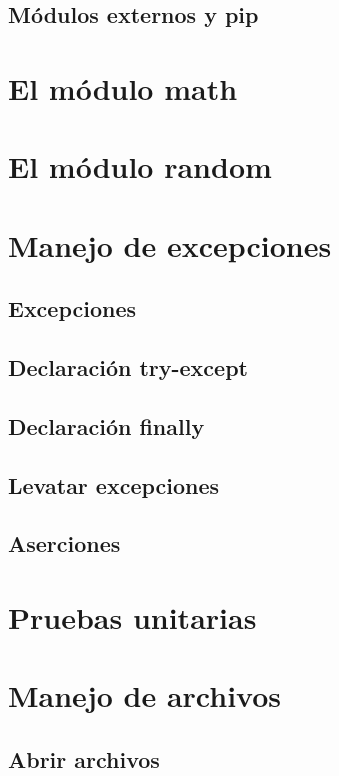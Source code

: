 \documentclass{article}
\begin{document}
\subsection{Módulos externos y pip}

\newpage\section{El módulo math}

\newpage\section{El módulo random}

\newpage\section{Manejo de excepciones}

\subsection{Excepciones}

\subsection{Declaración try-except}

\subsection{Declaración finally}

\subsection{Levatar excepciones}

\subsection{Aserciones}

\newpage\section{Pruebas unitarias}

\newpage\section{Manejo de archivos}

\subsection{Abrir archivos}
\end{document}

